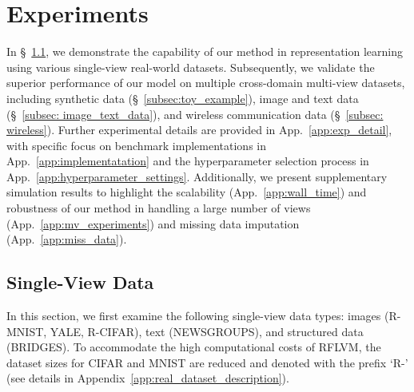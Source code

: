 \vspace{-0.09in}
\section{Experiments}
\vspace{-0.09in}
\label{sec:experiments}

In \S~\ref{subsec:single_view}, we demonstrate the capability of our method in representation learning using various single-view real-world datasets. Subsequently, we validate the superior performance of our model on multiple cross-domain multi-view datasets, including synthetic data (\S~\ref{subsec:toy_example}), image and text data (\S~\ref{subsec: image_text_data}), and wireless communication data (\S~\ref{subsec: wireless}). Further experimental details are provided in App.~\ref{app:exp_detail}, with specific focus on benchmark implementations in App.~\ref{app:implementatation} and the hyperparameter selection process in App.~\ref{app:hyperparameter_settings}. Additionally, we present supplementary simulation results to highlight the scalability (App.~\ref{app:wall_time}) and robustness of our method in handling a large number of views (App.~\ref{app:mv_experiments}) and missing data imputation (App.~\ref{app:miss_data}).




\vspace{-0.09in}
\subsection{Single-View Data}
\label{subsec:single_view}
\vspace{-0.09in}
In this section, we first examine the following single-view data types: images (\MakeUppercase{r-mnist}, \MakeUppercase{yale}, \MakeUppercase{r-cifar}), text (\MakeUppercase{newsgroups}), and structured data (\MakeUppercase{bridges}). 
To accommodate the high computational costs of RFLVM, the dataset sizes for \MakeUppercase{cifar} and \MakeUppercase{mnist} are reduced and denoted with the prefix `\MakeUppercase{r}-' (see details in Appendix~\ref{app:real_dataset_description}).



